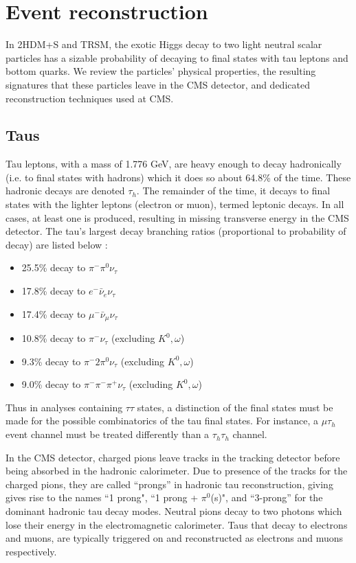 \documentclass{article}
\begin{document}
\section{Event reconstruction}
In 2HDM+S and TRSM, the exotic Higgs decay to two light neutral scalar particles has a sizable probability of decaying to final states with tau leptons and bottom quarks. We review the particles' physical properties, the resulting signatures that these particles leave in the CMS detector, and dedicated reconstruction techniques used at CMS.

\subsection{Taus}
Tau leptons, with a mass of 1.776 GeV, are heavy enough to decay hadronically (i.e. to final states with hadrons) which it does so about 64.8\% of the time. These hadronic decays are denoted $\tau_{h}$. The remainder of the time, it decays to final states with the lighter leptons (electron or muon), termed leptonic decays. In all cases, at least one is produced, resulting in missing transverse energy in the CMS detector. The tau's largest decay branching ratios (proportional to probability of decay) are listed below \cite{workman_review_2022}: 
\begin{itemize}
    \item 25.5\% decay to $\pi^- \pi^0 \nu_{\tau}$
    \item 17.8\% decay to $e^- \bar{\nu}_e \nu_{\tau}$
    \item 17.4\% decay to $\mu^- \bar{\nu}_\mu \nu_{\tau}$
    \item 10.8\% decay to $\pi^- \nu_{\tau}$ (excluding $K^0, \omega$)
    \item 9.3\% decay to $\pi^- 2\pi^0 \nu_{\tau}$ (excluding $K^0, \omega$)
    \item 9.0\% decay to $\pi^- \pi^- \pi^+ \nu_{\tau}$ (excluding $K^0, \omega$)
\end{itemize}

Thus in analyses containing $\tau\tau$ states, a distinction of the final states must be made for the possible combinatorics of the tau final states. For instance, a $\mu\tau_{h}$ event channel must be treated differently than a $\tau_{h}\tau_{h}$ channel.

In the CMS detector, charged pions leave tracks in the tracking detector before being absorbed in the hadronic calorimeter. Due to presence of the tracks for the charged pions, they are called ``prongs'' in hadronic tau reconstruction, giving gives rise to the names ``1 prong", ``1 prong + $\pi^0$(s)", and ``3-prong'' for the dominant hadronic tau decay modes. Neutral pions decay to two photons which lose their energy in the electromagnetic calorimeter. Taus that decay to electrons and muons, are typically triggered on and reconstructed as electrons and muons respectively. 
\end{document}
